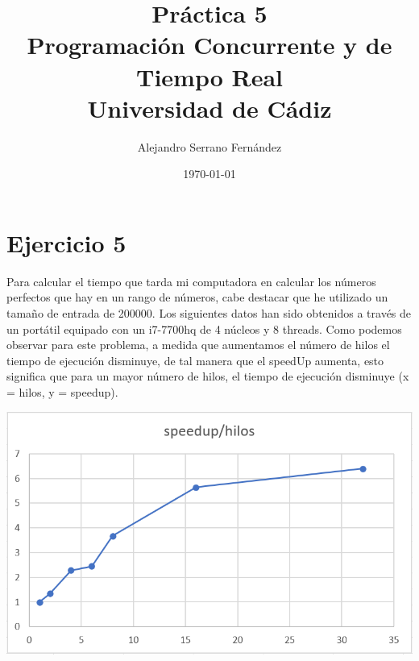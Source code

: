 \documentclass{article}
\title{Práctica 5 \\ Programación Concurrente y de Tiempo Real \\Universidad de Cádiz} %
\author{Alejandro Serrano Fernández} %
\date{\today} %
\begin{document}
\maketitle %



\section{Ejercicio 5}
Para calcular el tiempo que tarda mi computadora en calcular los números perfectos que hay en un rango de números, cabe destacar que he utilizado un tamaño de entrada de 200000. Los siguientes datos han sido obtenidos a través de un portátil equipado con un i7-7700hq de 4 núcleos y 8 threads. Como podemos observar para este problema, a medida que aumentamos el número de hilos el tiempo de ejecución disminuye, de tal manera que el speedUp aumenta, esto significa que para un mayor número de hilos, el tiempo de ejecución disminuye (x = hilos, y = speedup).

\hfill \break
\begin{center}
\includegraphics[scale=0.5]{grafico-ej5.png}
\end{center}
\end{document}
